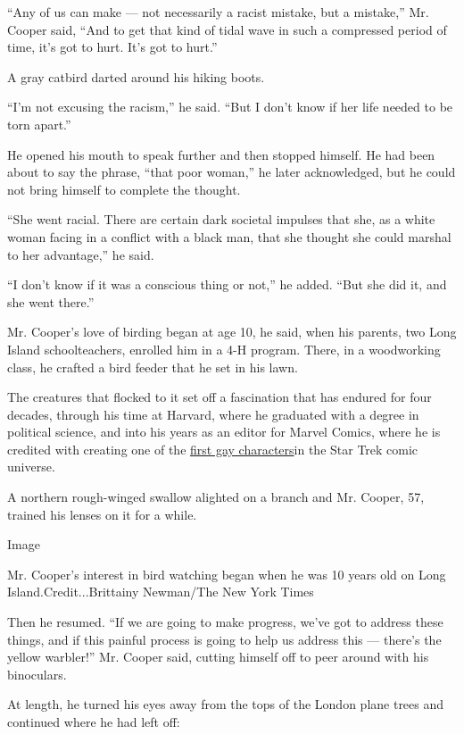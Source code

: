 ``Any of us can make --- not necessarily a racist mistake, but a
mistake,'' Mr. Cooper said, ``And to get that kind of tidal wave in such
a compressed period of time, it's got to hurt. It's got to hurt.''

A gray catbird darted around his hiking boots.

``I'm not excusing the racism,'' he said. ``But I don't know if her life
needed to be torn apart.''

He opened his mouth to speak further and then stopped himself. He had
been about to say the phrase, ``that poor woman,'' he later
acknowledged, but he could not bring himself to complete the thought.

``She went racial. There are certain dark societal impulses that she, as
a white woman facing in a conflict with a black man, that she thought
she could marshal to her advantage,'' he said.

``I don't know if it was a conscious thing or not,'' he added. ``But she
did it, and she went there.''

Mr. Cooper's love of birding began at age 10, he said, when his parents,
two Long Island schoolteachers, enrolled him in a 4-H program. There, in
a woodworking class, he crafted a bird feeder that he set in his lawn.

The creatures that flocked to it set off a fascination that has endured
for four decades, through his time at Harvard, where he graduated with a
degree in political science, and into his years as an editor for Marvel
Comics, where he is credited with creating one of the
\href{https://www.out.com/news/2020/5/26/man-center-viral-park-video-made-gay-star-trek-history?utm_source=facebook}{first
gay characters}in the Star Trek comic universe.

A northern rough-winged swallow alighted on a branch and Mr. Cooper, 57,
trained his lenses on it for a while.

Image

Mr. Cooper's interest in bird watching began when he was 10 years old on
Long Island.Credit...Brittainy Newman/The New York Times

Then he resumed. ``If we are going to make progress, we've got to
address these things, and if this painful process is going to help us
address this --- there's the yellow warbler!'' Mr. Cooper said, cutting
himself off to peer around with his binoculars.

At length, he turned his eyes away from the tops of the London plane
trees and continued where he had left off:

